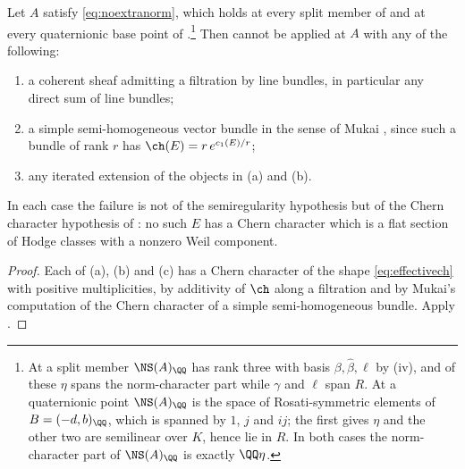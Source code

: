 \begin{corollary}\label{cor:nofiltered}
Let $A$ satisfy \eqref{eq:noextranorm}, which holds at every split member of
 and at every quaternionic base point of
.\footnote{At a split member $\NS(A)_{\QQ}$ has rank three
with basis $\beta,\widehat\beta,\ell$ by (iv), and of
these $\eta$ spans the norm-character part while $\gamma$ and $\ell$ span
$R$. At a quaternionic point $\NS(A)_{\QQ}$ is the space of Rosati-symmetric
elements of $B=(-d,b)_{\QQ}$, which is spanned by $1$, $j$ and $ij$; the first
gives $\eta$ and the other two are semilinear over $K$, hence lie in $R$. In
both cases the norm-character part of $\NS(A)_{\QQ}$ is exactly $\QQ\eta$.}
Then  cannot be applied at $A$ with any of the
following:
\begin{enumerate}[label=\textup{(\alph*)},nosep]
\item a coherent sheaf admitting a filtration by line bundles, in particular
  any direct sum of line bundles;
\item a simple semi-homogeneous vector bundle in the sense of Mukai
  \cite{Muk78}, since such a bundle of rank $r$ has $\ch(E)=r\,e^{c_{1}(E)/r}$;
\item any iterated extension of the objects in (a) and (b).
\end{enumerate}
In each case the failure is not of the semiregularity hypothesis but of the
Chern character hypothesis of : no such $E$ has a Chern
character which is a flat section of Hodge classes with a nonzero Weil
component.
\end{corollary}

\begin{proof}
Each of (a), (b) and (c) has a Chern character of the shape
\eqref{eq:effectivech} with positive multiplicities, by additivity of $\ch$
along a filtration and by Mukai's computation of the Chern character of a
simple semi-homogeneous bundle. Apply .
\end{proof}

